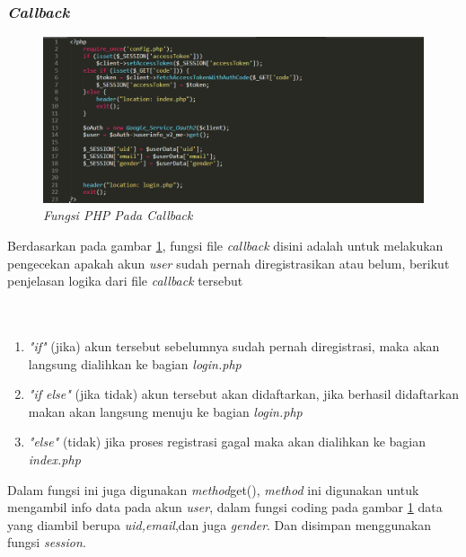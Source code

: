 \subsubsection{\textit{Callback}}
\begin{figure}[!htbp]
    \centering
    \includegraphics[scale=0.5]{gambar/callback}
    \caption{\textit{Fungsi PHP Pada Callback}}
    \label{callback}
\end{figure}
\par 
Berdasarkan pada gambar \ref{callback}, fungsi file \textit{callback} disini adalah untuk melakukan pengecekan apakah akun \textit{user} sudah pernah diregistrasikan atau belum, berikut penjelasan logika dari file \textit{callback} tersebut
\\
\\
\\
\begin{enumerate}
\item \textit{"if"} (jika) akun tersebut sebelumnya sudah pernah diregistrasi, maka akan langsung dialihkan ke bagian \textit{login.php}
\item \textit{"if else"} (jika tidak) akun tersebut akan didaftarkan, jika berhasil didaftarkan makan akan langsung menuju ke bagian \textit{login.php}
\item \textit{"else"} (tidak) jika proses registrasi gagal maka akan dialihkan ke bagian \textit{index.php}
\end{enumerate}
\par
Dalam fungsi ini juga digunakan \textit{method}get(), \textit{method} ini digunakan untuk mengambil info data pada akun \textit{user}, dalam fungsi coding pada gambar \ref{callback} data yang diambil berupa \textit{uid,email},dan juga \textit{gender}. Dan disimpan menggunakan fungsi \textit{session}.


